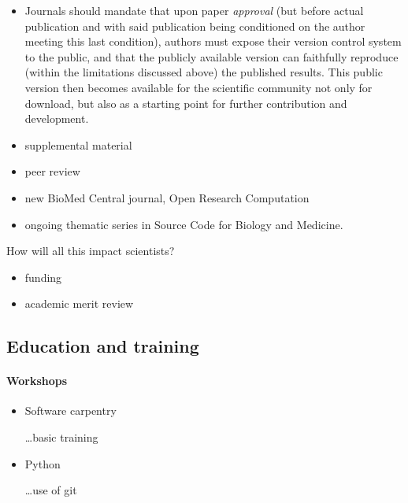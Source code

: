 \documentclass[ChapterTOCs,krantz2]{krantz} %
\begin{document}
\begin{itemize}
\item Journals should mandate that upon paper \emph{approval} (but before
actual publication and with said publication being conditioned on
the author meeting this last condition), authors must expose their
version control system to the public, and that the publicly available
version can faithfully reproduce (within the limitations discussed
above) the published results. This public version then becomes available
for the scientific community not only for download, but also as a
starting point for further contribution and development.

\item supplemental material

\item peer review

\item new BioMed Central journal, Open Research Computation

 \item ongoing thematic series in Source Code for Biology and Medicine.
\cite{neylon2012changing}

\end{itemize}

How will all this impact scientists?

\begin{itemize}

\item funding
\item academic merit review

\end{itemize}

\subsection{Education and training}

\paragraph{ {\bf Workshops}}

\begin{itemize}

\item Software carpentry

\ldots basic training

\item Python

\ldots use of git

\end{itemize}
\end{document}
